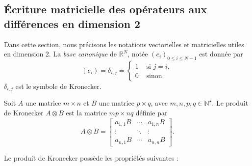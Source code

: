 \subsection{Écriture matricielle des opérateurs aux différences en dimension 2}

Dans cette section, nous précisons les notations vectorielles et matricielles utiles en dimension 2.
La \textit{base canonique} de $\mathbb{R}^N$, notée $\left(e_i \right)_{0 \leq i \leq N-1}$ est donnée par 
\begin{equation}
\left( e_i \right) = \delta_{i,j} = \left\lbrace
\begin{array}{rl}
1 & \text{ si } j=i,\\
0 & \text{ sinon.}
\end{array}
\right.
\end{equation}
$\delta_{i,j}$ est le symbole de Kronecker.

\begin{definition}
Soit $A$ une matrice $m \times n$ et $B$ une matrice $p \times q$, avec $m, n, p, q \in \mathbb{N}^{\star}$. Le produit de Kronecker $A \otimes B$ est la matrice $mp \times nq$ définie par
\begin{equation}
A \otimes B = 
\begin{bmatrix}
a_{1,1}B & \cdots & a_{1,n}B \\ 
\vdots & \ddots & \vdots \\ 
a_{n,1}B & \cdots & a_{n,n}B
\end{bmatrix} .
\end{equation}
\end{definition}
Le produit de Kronecker possède les propriétés suivantes \cite{VanLoan1992} :

